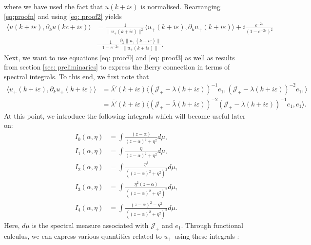\documentclass[a4paper,reqno,twoside]{amsart}
\numberwithin{equation}{section}
\theoremstyle{definition}
\newcommand{\<}{\ensuremath \leq}
\renewcommand{\>}{\ensuremath \geq}
\renewcommand{\epsilon}{\varepsilon}
\begin{document}
where we have used the fact that $u(k+i\epsilon)$ is normalised. Rearranging \eqref{eq:proofn} and using \eqref{eq: proof2} yields
\begin{equation}\label{eq: proof5}
    \begin{aligned}
        \langle u(k + i\epsilon),\partial_k u(kc+i\epsilon)\rangle &= \frac{1}{\lVert u_+(k+i\epsilon)\rVert^2}\langle u_+(k+i\epsilon),\partial_k u_+(k+i\epsilon)\rangle + i\frac{e^{-2\epsilon}}{(1- e^{-2\epsilon})^2}\\
        &- \frac{1}{1- e^{-2\epsilon}}\frac{\partial_k\lVert u_+(k+i\epsilon)\rVert}{\lVert u_+(k+i\epsilon)\rVert}.
    \end{aligned}
\end{equation}
Next, we want to use equations \eqref{eq: proof0} and \eqref{eq: proof3} as well as results from section \ref{sec: preliminaries} to express the Berry connection in terms of spectral integrals. To this end, we first note that
\begin{equation}\label{eq: proof6}
    \begin{aligned}
        \langle u_+(k+i\epsilon), \partial_ku_+(k+i\epsilon)\rangle &= \overline{\lambda'}(k+i\epsilon)\langle(\mathcal{J}_+ - \lambda(k+i\epsilon))^{-1}e_1,(\mathcal{J}_+ - \lambda(k+i\epsilon))^{-2}e_1,\rangle\\
        &=\overline{\lambda'}(k+i\epsilon)\langle (\mathcal{J}_+ - \overline{\lambda}(k+i\epsilon))^{-2}(\mathcal{J}_+ - \lambda(k+i\epsilon))^{-1}e_1,e_1\rangle.
    \end{aligned}
\end{equation}
At this point, we introduce the following integrals which will become useful later on:
\begin{equation}\label{eq: proof7}
    \begin{aligned}
        I_0 (\alpha,\eta) &= \int\frac{(z-\alpha)}{(z-\alpha)^2 + \eta^2}d\mu,\\
        I_1 (\alpha,\eta) 
        &= \int\frac{\eta}{(z-\alpha)^2 + \eta^2}d\mu,\\
        I_2 (\alpha,\eta) &= \int\frac{\eta^3}{((z-\alpha)^2+\eta^2)^2}d\mu,\\
         I_3 (\alpha,\eta)  &= \int\frac{\eta^2(z-\alpha)}{((z-\alpha)^2+\eta^2)^2}d\mu,\\
        I_4 (\alpha,\eta) &= \int \frac{(z-\alpha)^2 - \eta^2}{((z-\alpha)^2+\eta^2)^2}d\mu.
    \end{aligned}
\end{equation}
Here, $d\mu$ is the spectral measure associated with $\mathcal{J}_+$ and $e_1$. Through functional calculus, we can express various quantities related to $u_+$ using these integrals \cite{damanik.fillman2022OneDimensional,Teschl1999-dz}:
\end{document}
